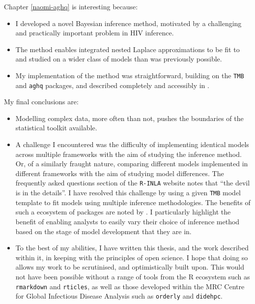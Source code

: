 \documentclass[a4paper, nobind]{templates/ociamthesis}
\providecommand{\tightlist}{%
  \setlength{\itemsep}{0pt}\setlength{\parskip}{0pt}}
\begin{document}
Chapter \ref{naomi-aghq} is interesting because:

\begin{itemize}
\tightlist
\item
  I developed a novel Bayesian inference method, motivated by a challenging and practically important problem in HIV inference.
\item
  The method enables integrated nested Laplace approximations to be fit to and studied on a wider class of models than was previously possible.
\item
  My implementation of the method was straightforward, building on the \texttt{TMB} and \texttt{aghq} packages, and described completely and accessibly in \textcite{howes2023fast}.
\end{itemize}

My final conclusions are:

\begin{itemize}
\tightlist
\item
  Modelling complex data, more often than not, pushes the boundaries of the statistical toolkit available.
\item
  A challenge I encountered was the difficulty of implementing identical models across multiple frameworks with the aim of studying the inference method. Or, of a similarly fraught nature, comparing different models implemented in different frameworks with the aim of studying model differences. The frequently asked questions section of the \texttt{R-INLA} website \autocite{rinla2023faq} notes that ``the devil is in the details''. I have resolved this challenge by using a given \texttt{TMB} model template to fit models using multiple inference methodologies. The benefits of such a ecosystem of packages are noted by \textcite{stringer2021fields}. I particularly highlight the benefit of enabling analysts to easily vary their choice of inference method based on the stage of model development that they are in.
\item
  To the best of my abilities, I have written this thesis, and the work described within it, in keeping with the principles of open science. I hope that doing so allows my work to be scrutinised, and optimistically built upon. This would not have been possible without a range of tools from the R ecosystem such as \texttt{rmarkdown} and \texttt{rticles}, as well as those developed within the MRC Centre for Global Infectious Disease Analysis such as \texttt{orderly} and \texttt{didehpc}.
\end{itemize}
\end{document}
